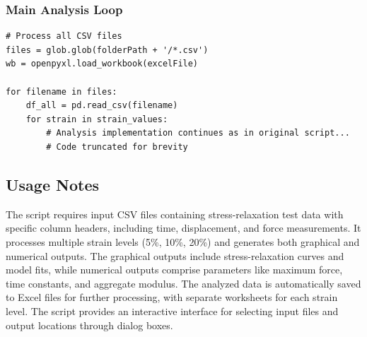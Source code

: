 \subsubsection{Main Analysis Loop}
\begin{lstlisting}[caption={Main analysis implementation}]
# Process all CSV files
files = glob.glob(folderPath + '/*.csv')
wb = openpyxl.load_workbook(excelFile)

for filename in files:
    df_all = pd.read_csv(filename)
    for strain in strain_values:
        # Analysis implementation continues as in original script...
        # Code truncated for brevity
\end{lstlisting}
\newpage
\subsection{Usage Notes}
The script requires input CSV files containing stress-relaxation test data with specific column headers, including time, displacement, and force measurements. It processes multiple strain levels (5\%, 10\%, 20\%) and generates both graphical and numerical outputs. The graphical outputs include stress-relaxation curves and model fits, while numerical outputs comprise parameters like maximum force, time constants, and aggregate modulus. The analyzed data is automatically saved to Excel files for further processing, with separate worksheets for each strain level. The script provides an interactive interface for selecting input files and output locations through dialog boxes.